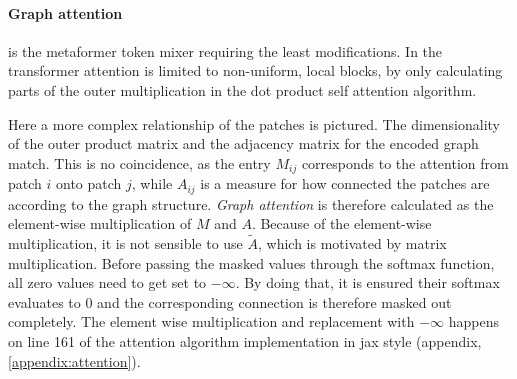 \paragraph{Graph attention} is the metaformer token mixer requiring the least modifications.
In \cite{swinTransformerPaper} the transformer attention is limited to non-uniform, local blocks, by only calculating parts of the outer multiplication in the dot product self attention algorithm. %

Here a more complex relationship of the patches is pictured. 
The dimensionality of the outer product matrix and the adjacency matrix for the encoded graph match. %
This is no coincidence, as the entry $M_{ij}$ corresponds to the attention from patch $i$ onto patch $j$, while $A_{ij}$ is a measure for how \glqq connected\grqq{} the patches are according to the graph structure.
\emph{Graph attention} is therefore calculated as the element-wise multiplication of $M$ and $A$.
Because of the element-wise multiplication, it is not sensible to use $\tilde{A}$, which is motivated by matrix multiplication.
Before passing the masked values through the softmax function, all zero values need to get set to $-\infty$.
By doing that, it is ensured their softmax evaluates to 0 and the corresponding connection is therefore masked out completely.
The element wise multiplication and replacement with $-\infty$ happens on line 161 of the attention algorithm implementation in jax style (appendix, \ref{appendix:attention}).

